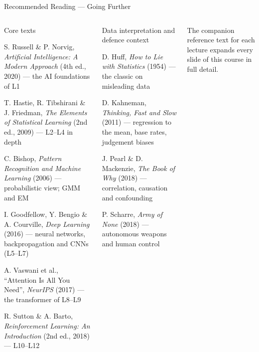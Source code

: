 \documentclass[aspectratio=169,10pt,t]{beamer}
\begin{document}
\begin{frame}{Recommended Reading --- Going Further}
\begin{columns}[T]
\begin{cbox}[ISSAnavy]{Core texts}\scriptsize\begin{tl}\item S. Russell \& P. Norvig, \textit{Artificial Intelligence: A Modern Approach} (4th ed., 2020) --- the AI foundations of L1\item T. Hastie, R. Tibshirani \& J. Friedman, \textit{The Elements of Statistical Learning} (2nd ed., 2009) --- L2--L4 in depth\item C. Bishop, \textit{Pattern Recognition and Machine Learning} (2006) --- probabilistic view; GMM and EM\item I. Goodfellow, Y. Bengio \& A. Courville, \textit{Deep Learning} (2016) --- neural networks, backpropagation and CNNs (L5--L7)\item A. Vaswani et al., ``Attention Is All You Need'', \textit{NeurIPS} (2017) --- the transformer of L8--L9\item R. Sutton \& A. Barto, \textit{Reinforcement Learning: An Introduction} (2nd ed., 2018) --- L10--L12\end{tl}\end{cbox}
\begin{cbox}[AccentCol]{Data interpretation and defence context}\scriptsize\begin{tl}\item D. Huff, \textit{How to Lie with Statistics} (1954) --- the classic on misleading data\item D. Kahneman, \textit{Thinking, Fast and Slow} (2011) --- regression to the mean, base rates, judgement biases\item J. Pearl \& D. Mackenzie, \textit{The Book of Why} (2018) --- correlation, causation and confounding\item P. Scharre, \textit{Army of None} (2018) --- autonomous weapons and human control\end{tl}\end{cbox}
\begin{ibox}\scriptsize The companion reference text for each lecture expands every slide of this course in full detail.\end{ibox}
\end{columns}
\end{frame}
\end{document}
